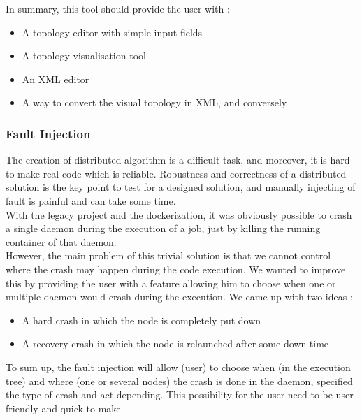 \documentclass{eplmastersthesis}
\begin{document}
          In summary, this tool should provide the user with :

          \begin{itemize}
            \item A topology editor with simple input fields
            \item A topology visualisation tool
            \item An XML editor
            \item A way to convert the visual topology in XML, and conversely
          \end{itemize}

        \subsubsection{Fault Injection}

          The creation of distributed algorithm is a difficult task, and
          moreover, it is hard to make real code which is reliable. Robustness
          and correctness of a distributed solution is the key point to test
          for a designed solution, and manually injecting of fault is painful
          and can take some time. \\

          With the legacy project and the dockerization, it was obviously
          possible to crash a single daemon during the execution of a job, just
          by killing the running container of that daemon.\\
          However, the main problem of this trivial solution is that we cannot
          control where the crash may happen during the code execution.
          We wanted to improve this by providing the user with a feature
          allowing him to choose when one or multiple daemon would crash during
          the execution. We came up with two ideas :

          \begin{itemize}
            \item A hard crash in which the node is completely put down
            \item A recovery crash in which the node is relaunched after some
            down time
          \end{itemize}

          To sum up, the fault injection will allow (user) to choose when (in
          the execution tree) and where (one or several nodes) the crash is done
          in the daemon, specified the type of crash and act depending. This
          possibility for the user need to be user friendly and quick to make.
\end{document}
